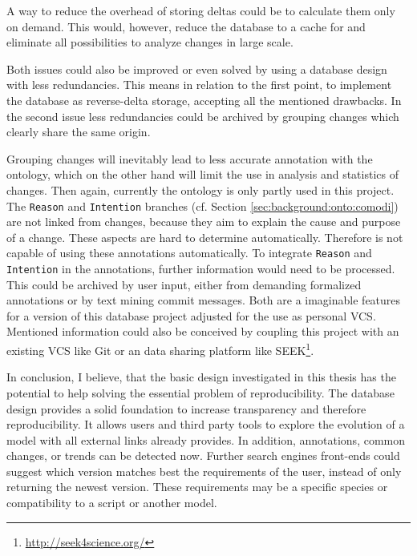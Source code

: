 A way to reduce the overhead of storing deltas could be to calculate them only on demand. This would, however, reduce the database to a cache for \bives and eliminate all possibilities to analyze changes in large scale.

Both issues could also be improved or even solved by using a database design with less redundancies. This means in relation to the first point, to implement the database as reverse-delta storage, accepting all the mentioned drawbacks.
In the second issue less redundancies could be archived by grouping changes which clearly share the same origin.

Grouping changes will inevitably lead to less accurate annotation with the \comodi ontology, which on the other hand will limit the use in analysis and statistics of changes. 
Then again, currently the \comodi ontology is only partly used in this project. The \texttt{Reason} and \texttt{Intention} branches (cf. Section \ref{sec:background:onto:comodi}) are not linked from changes, because they aim to explain the cause and purpose of a change. These aspects are hard to determine automatically. Therefore \bives is not capable of using these annotations automatically.
To integrate \texttt{Reason} and \texttt{Intention} in the annotations, further information would need to be processed. This could be archived by user input, either from demanding formalized annotations or by text mining commit messages. 
Both are a imaginable features for a version of this database project adjusted for the use as personal VCS.
Mentioned information could also be conceived by coupling this project with an existing VCS like Git or an data sharing platform like SEEK\footnote{\url{http://seek4science.org/}}.

In conclusion, I believe, that the basic design investigated in this thesis has the potential to help solving the essential problem of reproducibility. The database design provides a solid foundation to increase transparency and therefore reproducibility. It allows users and third party tools to explore the evolution of a model with all external links \masymos already provides. In addition, \comodi annotations, common changes, or trends can be detected now.
Further search engines front-ends could suggest which version matches best the requirements of the user, instead of only returning the newest version. These requirements may be a specific species or compatibility to a \sedml script or another model.

